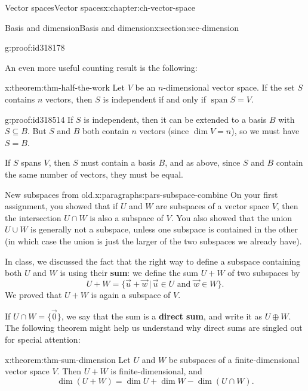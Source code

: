 \documentclass[oneside,10pt,]{book}
\newcommand{\terminology}[1]{\textbf{#1}}
\numberwithin{equation}{section}
\newcommand{\spn}{\operatorname{span}}
\begin{document}
\begin{chapterptx}{Vector spaces}{}{Vector spaces}{}{}{x:chapter:ch-vector-space}
\begin{sectionptx}{Basis and dimension}{}{Basis and dimension}{}{}{x:section:sec-dimension}
\begin{proofptx}{}{g:proof:id318178}
\begin{enumerate}
\end{enumerate}
%
\end{proofptx}
An even more useful counting result is the following:%
\begin{theorem}{}{}{x:theorem:thm-half-the-work}%
Let \(V\) be an \(n\)-dimensional vector space. If the set \(S\) contains \(n\) vectors, then \(S\) is independent if and only if \(\spn S=V\).%
\end{theorem}
\begin{proofptx}{}{g:proof:id318514}
If \(S\) is independent, then it can be extended to a basis \(B\) with \(S\subseteq B\). But \(S\) and \(B\) both contain \(n\) vectors (since \(\dim V=n\)), so we must have \(S=B\).%
\par
If \(S\) spans \(V\), then \(S\) must contain a basis \(B\), and as above, since \(S\) and \(B\) contain the same number of vectors, they must be equal.%
\end{proofptx}
\begin{paragraphs}{New subspaces from old.}{x:paragraphs:pars-subspace-combine}%
On your first assignment, you showed that if \(U\) and \(W\) are subspaces of a vector space \(V\), then the intersection \(U\cap W\) is also a subspace of \(V\). You also showed that the union \(U\cup W\) is generally not a subspace, unless one subspace is contained in the other (in which case the union is just the larger of the two subspaces we already have).%
\par
In class, we discussed the fact that the right way to define a subspace containing both \(U\) and \(W\) is using their \terminology{sum}: we define the sum \(U+W\) of two subspaces by%
\begin{equation*}
U+W = \{\vec{u}+\vec{w} \,|\, \vec{u}\in U \text{ and } \vec{w}\in W\}\text{.}
\end{equation*}
We proved that \(U+W\) is again a subspace of \(V\).%
\par
If \(U\cap W = \{\vec{0}\}\), we say that the sum is a \terminology{direct sum}, and write it as \(U\oplus W\). The following theorem might help us understand why direct sums are singled out for special attention:%
\begin{theorem}{}{}{x:theorem:thm-sum-dimension}%
Let \(U\) and \(W\) be subspaces of a finite-dimensional vector space \(V\). Then \(U+W\) is finite-dimensional, and%
\begin{equation*}
\dim(U+W)=\dim U + \dim W - \dim(U\cap W)\text{.}
\end{equation*}
%
\end{theorem}

\end{paragraphs}
\end{sectionptx}
\end{chapterptx}
\end{document}

